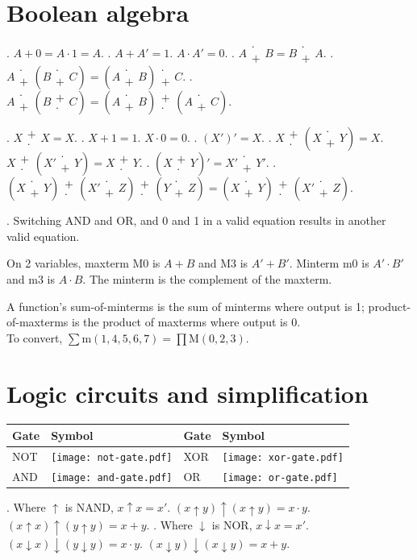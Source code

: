\documentclass{slnotes}
\newcommand{\cdotplus}{\mathbin{\substack{\cdot\\+}}}
\newcommand{\pluscdot}{\mathbin{\substack{+\\\cdot}}}
\begin{document}
\chapter{Boolean algebra}
. \(A + 0 = A \cdot 1 = A\). . \(A + A' = 1\). \(A \cdot A' = 0\). . \(A \cdotplus B = B \cdotplus A\). . \(A \cdotplus (B \cdotplus C) = (A \cdotplus B) \cdotplus C\). . \(A \cdotplus (B \pluscdot C) = (A \cdotplus B) \pluscdot (A \cdotplus C)\).

. \(X \pluscdot X = X\). . \(X + 1 = 1\). \(X \cdot 0 = 0\). . \((X')' = X\). . \(X \pluscdot (X \cdotplus Y) = X\). \(X \pluscdot (X' \cdotplus Y) = X \pluscdot Y\). . \((X \pluscdot Y)' = X' \cdotplus Y'\). . \((X \cdotplus Y) \pluscdot (X' \cdotplus Z) \pluscdot (Y \cdotplus Z) = (X \cdotplus Y) \pluscdot (X' \cdotplus Z)\).

. Switching AND and OR, and 0 and 1 in a valid equation results in another valid equation.

On 2 variables, maxterm M0 is \(A + B\) and M3 is \(A' + B'\). Minterm m0 is \(A' \cdot B'\) and m3 is \(A \cdot B\). The minterm is the complement of the maxterm.

A function's sum-of-minterms is the sum of minterms where output is 1; product-of-maxterms is the product of maxterms where output is 0.\\To convert, \(\sum \mathrm m(1,4,5,6,7) = \prod \mathrm M(0, 2, 3)\).

\chapter{Logic circuits and simplification}
\begin{tabular}{m{2.5em}m{4.5em}m{2.5em}m{4.5em}}
\toprule
Gate & Symbol & Gate & Symbol\tabularnewline
\midrule
NOT & \texttt{[image: not-gate.pdf]} & XOR & \texttt{[image: xor-gate.pdf]}\tabularnewline
AND & \texttt{[image: and-gate.pdf]} & OR & \texttt{[image: or-gate.pdf]}\tabularnewline
\bottomrule
\end{tabular}

. Where \(\uparrow\) is NAND, \(x \uparrow x = x'\). \((x \uparrow y) \uparrow (x \uparrow y) = x \cdot y\). \((x \uparrow x) \uparrow (y \uparrow y) = x + y\). . Where \(\downarrow\) is NOR, \(x \downarrow x = x'\). \((x \downarrow x) \downarrow (y \downarrow y) = x \cdot y\). \((x \downarrow y) \downarrow (x \downarrow y) = x + y\).
\end{document}
